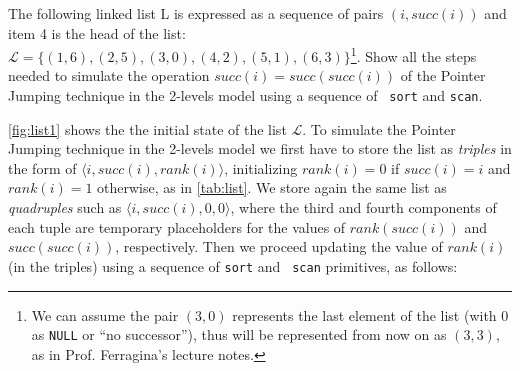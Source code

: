 \exercise

The following linked list L is expressed as a sequence of pairs $(i, succ(i))$
and item 4 is the head of the list: $\mathcal{L} = \{ (1,6), (2,5), (3,0),
(4,2), (5,1), (6,3) \}$\footnote{We can assume the pair $(3, 0)$ represents the
last element of the list (with 0 as {\tt NULL} or ``no successor''), thus will
be represented from now on as $(3, 3)$, as in Prof. Ferragina's lecture notes.}.
Show all the steps needed to simulate the operation $succ(i) = succ(succ(i))$ of
the Pointer Jumping technique in the 2-levels model using a sequence of {\tt
sort} and {\tt scan}.

\solution

\autoref{fig:list1} shows the the initial state of the list $\mathcal{L}$. To
simulate the Pointer Jumping technique in the 2-levels model we first have to
store the list as \emph{triples} in the form of $\langle i, succ(i), rank(i)
\rangle$, initializing $rank(i) = 0$ if $succ(i) = i$ and $rank(i) = 1$
otherwise, as in \autoref{tab:list}. We store again the same list as
\emph{quadruples} such as $\langle i, succ(i), 0, 0 \rangle$, where the third
and fourth components of each tuple are temporary placeholders for the values of
$rank(succ(i))$ and $succ(succ(i))$, respectively. Then we proceed updating the
value of $rank(i)$ (in the triples) using a sequence of {\tt sort} and {\tt
scan} primitives, as follows:
%
